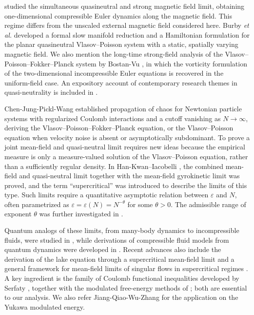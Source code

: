 \documentclass[11pt,reqno]{amsart}
\numberwithin{equation}{section}
\begin{document}
\cite{pu2016quasineutral} studied the simultaneous quasineutral
and strong magnetic field limit, obtaining one-dimensional
compressible Euler dynamics along the magnetic field.
This regime differs from the unscaled external magnetic
field considered here.
Burby {\it et al.} \cite{burby2025hamiltonian} developed a formal
slow manifold reduction and a Hamiltonian formulation for
the planar quasineutral Vlasov--Poisson system with a static,
spatially varying magnetic field.
We also mention the long-time strong-field analysis of the Vlasov–Poisson–Fokker–Planck 
system by Bostan-Vu \cite{bostan2023asymptotic}, in which the vorticity formulation 
of the two-dimensional incompressible Euler equations is recovered 
in the uniform-field case. An expository account of contemporary research 
themes in quasi-neutrality is included in \cite{iacobelli2026quasineutral,griffin2021recent}.  

 Chen-Jung-Pickl-Wang \cite{chen2026vpfp}
established propagation of chaos for Newtonian particle systems
with regularized Coulomb interactions and a cutoff vanishing
as $N\to\infty$, deriving the Vlasov--Poisson--Fokker--Planck
equation, or the Vlasov--Poisson equation when velocity noise
is absent or asymptotically subdominant. To prove a joint mean-field and quasi-neutral limit requires new ideas 
 because the empirical measure is only a measure-valued solution 
 of the Vlasov--Poisson equation, rather than a sufficiently regular density. 
 In Han-Kwan--Iacobelli \cite{han2021newton}, 
 the combined mean-field and quasi-neutral limit together with the mean-field gyrokinetic 
 limit was proved, and the term ``supercritical'' was introduced to describe the limits of this type. 
 Such limits require a quantitative asymptotic relation between $\varepsilon$ and $N$, 
 often parametrized as $\varepsilon=\varepsilon(N)=N^{-\theta}$ for some $\theta>0$. 
 The admissible range of exponent $\theta$ was further investigated in \cite{rosenzweig2023rigorous}.

Quantum analogs of these limits, from many-body dynamics to incompressible fluids, were studied in \cite{rosenzweig2021quantum,porat2023derivation}, 
while derivations of compressible fluid models from quantum dynamics were developed in \cite{grenier1998semiclassical,jungel2003convergence,chen2025meanfield,porat2025quantum}. 
Recent advances also include the derivation of the lake equation through a supercritical 
mean-field limit \cite{rosenzweig2025lake} and a general framework 
for mean-field limits of singular flows in supercritical 
regimes \cite{rosenzweig2025commutators}. A key ingredient 
is the family of Coulomb functional inequalities developed by Serfaty \cite{duerinckx2020mean}, 
together with the modulated free-energy methods of \cite{bresch2020modulated}; 
both are essential to our analysis. We also refer 
Jiang-Qiao-Wu-Zhang \cite{jiang2026yukawa} for the application on the Yukawa modulated energy.
\end{document}
